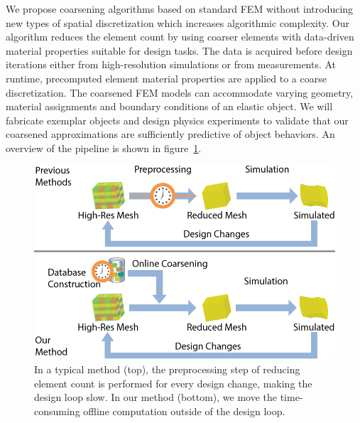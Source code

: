 We propose coarsening algorithms based on standard FEM
without introducing new types of spatial discretization which increases
algorithmic complexity.
Our algorithm reduces the element count by using coarser elements with data-driven
material properties suitable for design tasks.
The data is acquired before design iterations either from high-resolution simulations or from measurements.
At runtime, precomputed element material properties are applied to a coarse discretization.
The coarsened FEM models can accommodate varying geometry,
material assignments and boundary conditions of an elastic object.
We will fabricate exemplar objects and design physics experiments to validate that our coarsened approximations are sufficiently predictive of object behaviors.
An overview of the pipeline is shown in figure~\ref{fig:overview}.
\begin{figure}[ht]
	\centering
	\includegraphics[width=0.7\columnwidth]{images/overview.png}
	\caption{
		In a typical method (top), the preprocessing step of reducing element count is performed for every design change, making the design loop slow.
		In our method (bottom), we move the time-consuming offline computation outside of the design loop.
	}
	\label{fig:overview}
\end{figure}
